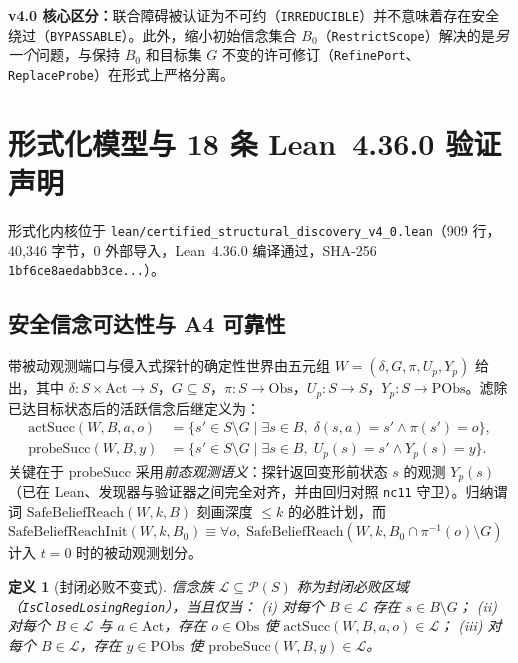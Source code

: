 \documentclass[10pt,a4paper]{article}
\newcommand{\code}[1]{\nolinkurl{#1}}
\newtheorem{definition}{定义}[section]
\newcommand{\takeaway}[2]{%
  \vspace{4pt}\noindent\colorbox{primary!7}{%
    \parbox{\dimexpr\linewidth-2\fboxsep\relax}{%
      \vspace{3pt}\textbf{\color{primary}#1：}\hspace{0.3em}#2\vspace{3pt}%
    }%
  }\vspace{4pt}%
}
\begin{document}
\takeaway{v4.0 核心区分}{联合障碍被认证为不可约（\code{IRREDUCIBLE}）并不意味着存在安全绕过（\code{BYPASSABLE}）。此外，缩小初始信念集合 $B_0$（\code{RestrictScope}）解决的是\emph{另一个}问题，与保持 $B_0$ 和目标集 $G$ 不变的许可修订（\code{RefinePort}、\code{ReplaceProbe}）在形式上严格分离。}

\section{形式化模型与 18 条 Lean~4.36.0 验证声明}

形式化内核位于 \code{lean/certified_structural_discovery_v4_0.lean}（909 行，40,346 字节，0 外部导入，Lean~4.36.0 编译通过，SHA-256 \code{1bf6ce8aedabb3ce...}）。

\subsection{安全信念可达性与 A4 可靠性}

带被动观测端口与侵入式探针的确定性世界由五元组 $W = (\delta, G, \pi, U_p, Y_p)$ 给出，其中 $\delta: S \times \mathrm{Act} \to S$，$G \subseteq S$，$\pi: S \to \mathrm{Obs}$，$U_p: S \to S$，$Y_p: S \to \mathrm{PObs}$。滤除已达目标状态后的活跃信念后继定义为：
\begin{align*}
\mathrm{actSucc}(W, B, a, o) &= \{ s' \in S \setminus G \mid \exists s \in B,\; \delta(s, a) = s' \land \pi(s') = o \}, \\
\mathrm{probeSucc}(W, B, y)  &= \{ s' \in S \setminus G \mid \exists s \in B,\; U_p(s) = s' \land Y_p(s) = y \}.
\end{align*}
关键在于 $\mathrm{probeSucc}$ 采用\emph{前态观测语义}：探针返回变形前状态 $s$ 的观测 $Y_p(s)$（已在 Lean、发现器与验证器之间完全对齐，并由回归对照 \code{nc11} 守卫）。归纳谓词 $\mathrm{SafeBeliefReach}(W, k, B)$ 刻画深度 $\le k$ 的必胜计划，而 $\mathrm{SafeBeliefReachInit}(W, k, B_0) \equiv \forall o,\; \mathrm{SafeBeliefReach}(W, k, B_0 \cap \pi^{-1}(o) \setminus G)$ 计入 $t=0$ 时的被动观测划分。

\begin{definition}[封闭必败不变式]\label{def:clr}
信念族 $\mathcal{L} \subseteq \mathcal{P}(S)$ 称为\emph{封闭必败区域}（\code{IsClosedLosingRegion}），当且仅当：
(i) 对每个 $B \in \mathcal{L}$ 存在 $s \in B \setminus G$；
(ii) 对每个 $B \in \mathcal{L}$ 与 $a \in \mathrm{Act}$，存在 $o \in \mathrm{Obs}$ 使 $\mathrm{actSucc}(W,B,a,o) \in \mathcal{L}$；
(iii) 对每个 $B \in \mathcal{L}$，存在 $y \in \mathrm{PObs}$ 使 $\mathrm{probeSucc}(W,B,y) \in \mathcal{L}$。
\end{definition}
\end{document}
